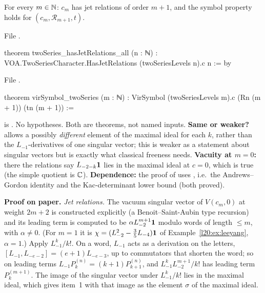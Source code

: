 \begin{theorem}\label{l20:thm:virinputs}
For every $m\in{\mathbb{N}}$: $c_m$ has jet relations of order $m+1$, and the symbol property holds for $(c_m,\mathcal R_{m+1},t)$.
\end{theorem}
\noindent File .
\begin{leancode}
theorem twoSeries_hasJetRelations_all (n : ℕ) :
    VOA.TwoSeriesCharacter.HasJetRelations (twoSeriesLevels n).c n := by
\end{leancode}
\noindent File .
\begin{leancode}
theorem virSymbol_twoSeries (m : ℕ) :
    VirSymbol (twoSeriesLevels m).c (Rn (m + 1)) (tn (m + 1)) :=
\end{leancode}

\begin{dictionary}
 is . No hypotheses. Both are theorems, not named inputs. \textbf{Same or weaker?}  allows a possibly \emph{different} element of the maximal ideal for each
$k$, rather than the $L_{-1}$-derivatives of one singular vector; this is weaker as a statement about singular vectors but is exactly
what classical freeness needs. \textbf{Vacuity at $m=0$:} there the relations say $L_{-2-k}\mathbf{1}$ lies in the maximal ideal at
$c=0$, which is true (the simple quotient is ${\mathbb{C}}$). \textbf{Dependence:} the proof of  uses
, i.e.\ the Andrews--Gordon identity and the Kac-determinant lower bound (both proved).
\end{dictionary}

\textbf{Proof on paper.} \emph{Jet relations.} The vacuum singular vector of $V(c_m,0)$ at weight $2m+2$ is constructed
explicitly (a Benoit--Saint-Aubin type recursion) and its leading term is computed to be $\alpha L_{-2}^{m+1}\mathbf{1}$ modulo
words of length $\le m$, with $\alpha\ne0$. (For $m=1$ it is $\chi=(L_{-2}^2-\frac35L_{-4})\mathbf{1}$ of Example~\ref{l20:ex:leeyang},
$\alpha=1$.) Apply $L_{-1}^k/k!$. On a word, $L_{-1}$ acts as a derivation on the letters, $[L_{-1},L_{-e-2}]=(e+1)L_{-e-3}$, up to
commutators that shorten the word; so on leading terms $L_{-1}P^{(n)}_k=(k+1)P^{(n)}_{k+1}$, and $L_{-1}^kL_{-2}^{m+1}/k!$ has leading
term $P^{(m+1)}_k$. The image of the singular vector under $L_{-1}^k/k!$ lies in the maximal ideal, which gives item~1 with that
image as the element $\sigma$ of the maximal ideal.

